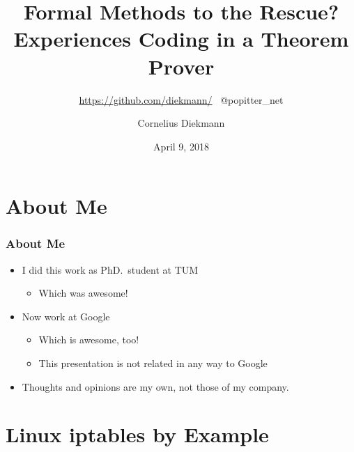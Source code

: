 \documentclass[aspectratio=169]{beamer}
\title{Formal Methods to the Rescue? Experiences Coding in a Theorem Prover}
\subtitle{\url{https://github.com/diekmann/} \  @popitter\_net}
\author{Cornelius Diekmann}
\date{April 9, 2018}
\begin{document}
\setcounter{showProgressBar}{0}
\setcounter{showSlideNumbers}{0}

\frame{\titlepage}




\setcounter{framenumber}{0}
\setcounter{showProgressBar}{1}
\setcounter{showSlideNumbers}{1}


\section{About Me}
\begin{frame}
	\frametitle{About Me}
	\begin{itemize}
		\item I did this work as PhD.\ student at TUM
		\begin{itemize}
			\item Which was awesome!
		\end{itemize}
		\item Now work at Google
		\begin{itemize}
			\item Which is awesome, too!
			\item This presentation is not related in any way to Google
		\end{itemize}
		\item Thoughts and opinions are my own, not those of my company.
	\end{itemize}
\end{frame}



\section{Linux iptables by Example}
\end{document}
